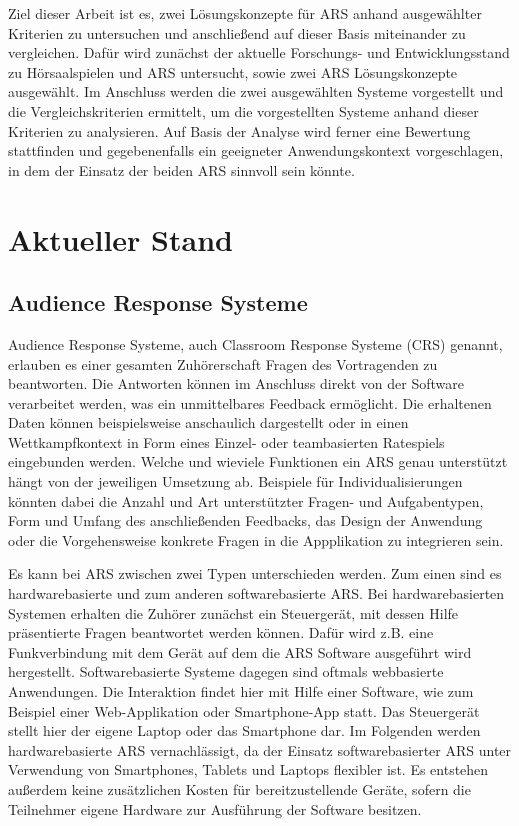 \documentclass[conference]{IEEEtran}
\begin{document}
Ziel dieser Arbeit ist es, zwei Lösungskonzepte für ARS anhand ausgewählter Kriterien zu untersuchen und anschließend auf dieser Basis miteinander zu vergleichen. Dafür wird zunächst der aktuelle Forschungs- und Entwicklungsstand zu Hörsaalspielen und ARS untersucht, sowie zwei ARS Lösungskonzepte ausgewählt. Im Anschluss werden die zwei ausgewählten Systeme vorgestellt und die Vergleichskriterien ermittelt, um die vorgestellten Systeme anhand dieser Kriterien zu analysieren. 
Auf Basis der Analyse wird ferner eine Bewertung stattfinden und gegebenenfalls ein geeigneter Anwendungskontext vorgeschlagen, in dem der Einsatz der beiden ARS sinnvoll sein könnte.

\section{Aktueller Stand}
\subsection{Audience Response Systeme}
Audience Response Systeme, auch Classroom Response Systeme (CRS) genannt, erlauben es einer gesamten Zuhörerschaft Fragen des Vortragenden zu beantworten. Die Antworten können im Anschluss direkt von der Software verarbeitet werden, was ein unmittelbares Feedback ermöglicht. Die erhaltenen Daten können beispielsweise anschaulich dargestellt oder in einen Wettkampfkontext in Form eines Einzel- oder teambasierten Ratespiels eingebunden werden. Welche und wieviele Funktionen ein ARS genau unterstützt hängt von der jeweiligen Umsetzung ab. Beispiele für Individualisierungen könnten dabei die Anzahl und Art unterstützter Fragen- und Aufgabentypen, Form und Umfang des anschließenden Feedbacks, das Design der Anwendung oder die Vorgehensweise konkrete Fragen in die Appplikation zu integrieren sein. 

Es kann bei ARS zwischen zwei Typen unterschieden werden. Zum einen sind es hardwarebasierte und zum anderen softwarebasierte ARS. Bei hardwarebasierten Systemen erhalten die Zuhörer zunächst ein Steuergerät, mit dessen Hilfe präsentierte Fragen beantwortet werden können. Dafür wird z.B. eine Funkverbindung mit dem Gerät auf dem die ARS Software ausgeführt wird hergestellt. 
Softwarebasierte Systeme dagegen sind oftmals webbasierte Anwendungen. Die Interaktion findet hier mit Hilfe einer Software, wie zum Beispiel einer Web-Applikation oder Smartphone-App statt. Das Steuergerät stellt hier der eigene Laptop oder das Smartphone dar.
Im Folgenden werden hardwarebasierte ARS vernachlässigt, da der Einsatz softwarebasierter ARS unter Verwendung von Smartphones, Tablets und Laptops flexibler ist. \cite[S. 340]{Hobert2017} Es entstehen außerdem keine zusätzlichen Kosten für bereitzustellende Geräte, sofern die Teilnehmer eigene Hardware zur Ausführung der Software besitzen.
\end{document}

